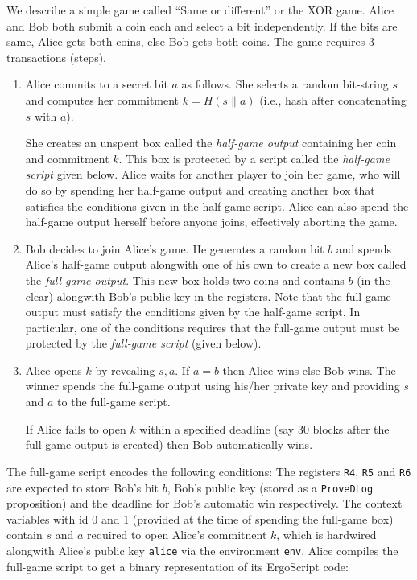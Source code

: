 \documentclass[11pt]{article}
\newcommand{\langname}{ErgoScript\xspace}
\begin{document}
We describe a simple game called ``Same or different'' or the XOR game. Alice and Bob both submit a coin each and select a bit independently. If the bits are same, Alice gets both coins, else Bob gets both coins. The game requires 3 transactions (steps). 
\begin{enumerate}
	\item Alice commits to a secret bit $a$ as follows. She selects a random bit-string $s$ and computes her commitment $k = H(s\|a)$ (i.e., hash after concatenating $s$ with $a$).
	
	She creates an unspent box called the {\em half-game output} containing her coin and commitment $k$. This box is protected by a script called the {\em half-game script}  given below. Alice waits for another player to join her game, who will do so by spending her half-game output and creating another box that satisfies the conditions given in the half-game script. Alice can also spend the half-game output herself before anyone joins, effectively aborting the game. 
	
	\item Bob decides to join Alice's game. He generates a random bit $b$ and spends Alice's half-game output alongwith one of his own to create a new box called the {\em full-game output}. This new box  holds two coins and contains $b$ (in the clear) alongwith Bob's public key in the registers. 
	Note that the full-game output must satisfy the conditions given by the half-game script. In particular, one of the conditions requires that the full-game output must be protected by the {\em full-game script} (given below).
	\item Alice opens $k$ by revealing $s, a$. If $a = b$ then Alice wins else Bob wins. The winner spends the full-game output using his/her private key and providing $s$ and $a$ to the full-game script.

	If Alice fails to open $k$ within a specified deadline (say 30 blocks after the full-game output is created) then Bob automatically wins. 
\end{enumerate}

The full-game script encodes the following conditions: The registers \texttt{R4}, \texttt{R5} and \texttt{R6} are expected to store Bob's bit $b$, Bob's public key (stored as a \texttt{ProveDLog} proposition) and the deadline for Bob's automatic win respectively. The context variables with id 0 and 1 (provided at the time of spending the full-game box) contain $s$ and $a$ required to open Alice's commitnent $k$, which is hardwired alongwith Alice's public key \texttt{alice} via the environment \texttt{env}. 
Alice compiles the full-game script to get a binary representation of its \langname code: 
\end{document}
